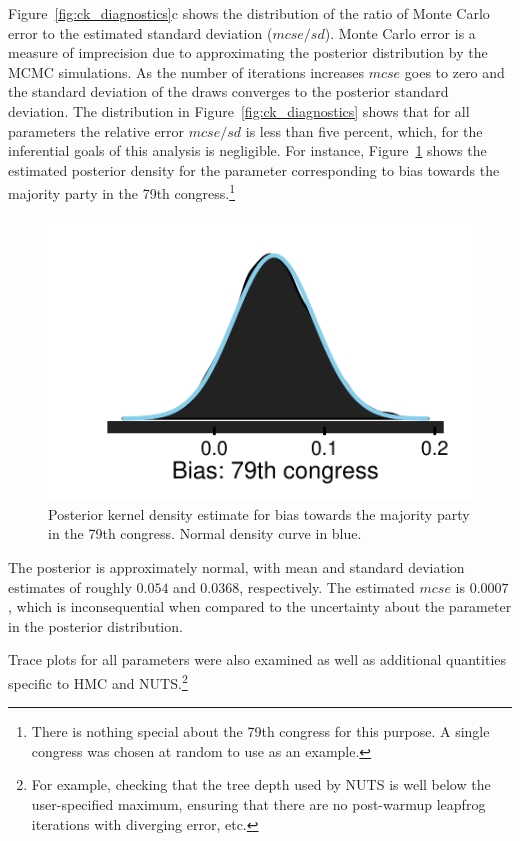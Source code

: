 Figure~{\ref{fig:ck_diagnostics}c} shows the distribution of the ratio of Monte Carlo error to the estimated standard deviation ($mcse/sd$). Monte Carlo error is a measure of imprecision due to approximating the posterior distribution by the MCMC simulations. As the number of iterations increases $mcse$ goes to zero and the standard deviation of the draws converges to the posterior standard deviation. The distribution in Figure~\ref{fig:ck_diagnostics} shows that for all parameters the relative error $mcse/sd$ is less than five percent, which, for the inferential goals of this analysis is negligible. For instance, Figure~\ref{fig:ck_example_posterior} shows the estimated posterior density for the parameter corresponding to bias towards the majority party in the 79th congress.\footnote{There is nothing special about the 79th congress for this purpose. A single congress was chosen at random to use as an example.} 
%
\begin{figure}[h]
\centering
	\includegraphics[scale=0.75]{sections/figs/example_posterior}
\caption{Posterior kernel density estimate for bias towards the majority party in the 79th congress. Normal density curve in blue.}
\label{fig:ck_example_posterior}
\end{figure}
%
\noindent The posterior is approximately normal, with mean and standard deviation estimates of roughly $0.054$ and $0.0368$, respectively. The estimated $mcse$ is $0.0007$, which is inconsequential when compared to the uncertainty about the parameter in the posterior distribution.   


Trace plots for all parameters were also examined as well as additional quantities specific to HMC and NUTS.\footnote{For example, checking that the tree depth used by NUTS is well below the user-specified maximum, ensuring that there are no post-warmup leapfrog iterations with diverging error, etc.}




